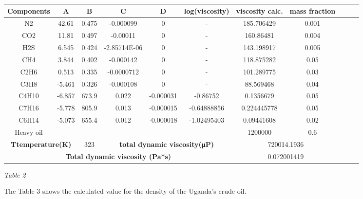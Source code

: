 \documentclass[12pt]{article}
\begin{document}
{\begin{table}[H]
	\begin{tabular}{|c|c|c|c|c|c|c|c|c|c|c|}
	  \hline
	  \textbf{Components} & \textbf{A} & \textbf{B} & \textbf{C} & \textbf{D} & \textbf{log(viscosity)} & \textbf{viscosity calc.} & \textbf{mass fraction} \\
	  \hline
		N2 & 42.61 & 0.475 & -0.000099 & 0 & - & 185.706429 & 0.001 \\
		\hline
		CO2 & 11.81 & 0.497 & -0.00011 & 0 & - & 160.86481 & 0.004 \\
		\hline
		H2S & 6.545 & 0.424 & -2.85714E-06 & 0 & - & 143.198917 & 0.005 \\
		\hline
		CH4 & 3.844 & 0.402 & -0.000142 & 0 & - & 118.875282 & 0.05 \\
		\hline
		C2H6 & 0.513 & 0.335 & -0.0000712 & 0 & - & 101.289775 & 0.03 \\
		\hline
		C3H8 & -5.461 & 0.326 & -0.000108 & 0 & - & 88.569468 & 0.04 \\
		\hline
		C4H10 & -6.857 & 673.9 & 0.022 & -0.000031 & -0.86752 & 0.1356679 & 0.05 \\
		\hline
		C7H16 & -5.778 & 805.9 & 0.013 & -0.000015 & -0.64888856 & 0.224445778 & 0.05 \\
		\hline
		C6H14 & -5.073 & 655.4 & 0.012 & -0.000018 & -1.02495403 & 0.09441608 & 0.02 \\
		\hline
		Heavy oil & & & & & & 1200000 & 0.6 \\
		\hline
		\multicolumn{2}{|c|}{\textbf{Ttemperature(K)}} & 323 & \multicolumn{3}{|c|}{\textbf{total dynamic viscosity(μP)}} & \multicolumn{2}{|c|}{720014.1936} \\
		\hline
		\multicolumn{6}{|c|}{\textbf{Total dynamic viscosity (Pa*s)}} & 
		\multicolumn{2}{|c|}{0.072001419} \\
		\hline
	\end{tabular}
	\begin{center}
	\textit{Table 2}
	\end{center}
  \end{table}

}

{\fontsize{12pt}{12pt}\selectfont 
\hspace*{1em} The Table 3 shows the calculated value for the density of the Uganda’s crude oil.
}
\end{document}
